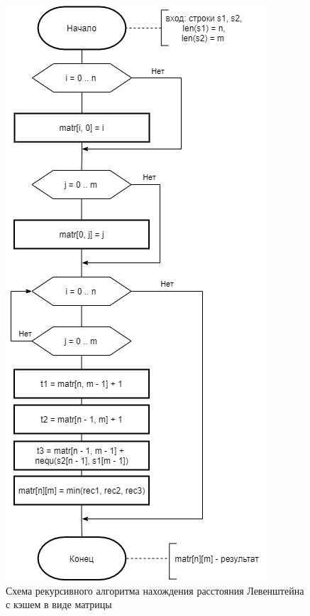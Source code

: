 \documentclass{report}
\begin{document}
\begin{figure}[h!p]\label{LevMatr}
	\centering
	\includegraphics[scale = 0.7]{LevMatr.drawio.png}
	\caption{Схема рекурсивного алгоритма нахождения расстояния Левенштейна с кэшем в виде матрицы}
	\label{fig:mpr2}
\end{figure}
\end{document}
